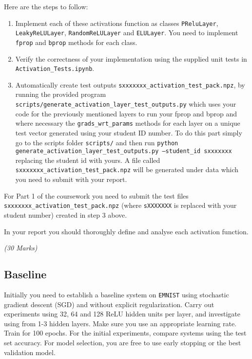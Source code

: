\documentclass[11pt,]{article}
\begin{document}
Here are the steps to follow:
\begin{enumerate}
    \item Implement each of these activations function as classes \texttt{PReluLayer}, \texttt{LeakyReLULayer}, \texttt{RandomReLULayer} and \texttt{ELULayer}. You need to implement \texttt{fprop} and \texttt{bprop} methods for each class.
    
    \item Verify the correctness of your implementation using the supplied unit tests in \texttt{Activation\_Tests.ipynb}.
    
    \item Automatically  create  test outputs  \texttt{sxxxxxxx\_activation\_test\_pack.npz},   by  running  the  provided  program 
    \texttt{scripts/generate\_activation\_layer\_test\_outputs.py} which uses your code for the previously mentioned layers to run your fprop and bprop and where necessary the \texttt{grads\_wrt\_params} methods for each layer on a unique test vector generated using your student 
    ID number.
    To do this part simply go to the scripts folder \texttt{scripts/} and then run \texttt{python generate\_activation\_layer\_test\_outputs.py --student\_id sxxxxxxx} replacing the student id with yours. A file called \texttt{sxxxxxxx\_activation\_test\_pack.npz} will be generated under data which you need to submit with your report.
    
\end{enumerate}

For Part 1 of the coursework you need to submit the test files \texttt{sxxxxxxx\_activation\_test\_pack.npz} (where \texttt{sXXXXXXX} is replaced with your student number) created in step 3 above.

In your report you should thoroughly define and analyse each activation function.

\emph{(30 Marks)}

\subsection{Baseline}
\label{sec:baseline}
Initially you need to establish a baseline system on \texttt{EMNIST} using stochastic gradient descent (SGD) and without explicit regularization.  Carry out experiments using 32, 64 and 128 ReLU hidden units per layer, and investigate using from 1-3 hidden layers.  Make sure you  use an appropriate learning rate. Train for 100 epochs. For the initial experiments, compare systems using the test set accuracy. For model selection, you are free to use early stopping or the best validation model. 
\end{document}
